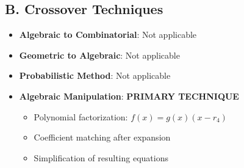 \documentclass[]{article}
\begin{document}
\begin{tacticalbox}
\subsection*{B. Crossover Techniques}
\begin{itemize}[leftmargin=*]
    \item \textbf{Algebraic to Combinatorial}: Not applicable
    
    \item \textbf{Geometric to Algebraic}: Not applicable
    
    \item \textbf{Probabilistic Method}: Not applicable
    
    \item \textbf{Algebraic Manipulation}: \textbf{PRIMARY TECHNIQUE}
    \begin{itemize}
        \item Polynomial factorization: $f(x) = g(x)(x-r_4)$
        \item Coefficient matching after expansion
        \item Simplification of resulting equations
    \end{itemize}
\end{itemize}
\end{tacticalbox}
\end{document}
